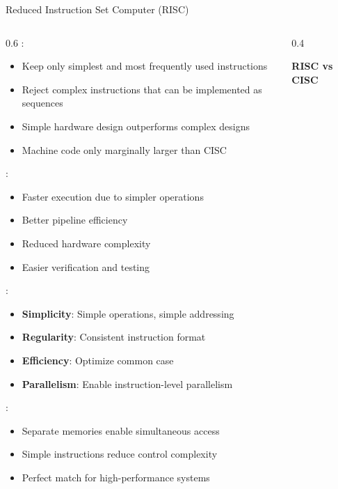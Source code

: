 \begin{frame}{Reduced Instruction Set Computer (RISC)}
\begin{columns}
\begin{column}{0.6\textwidth}
:
\begin{itemize}
\item Keep only simplest and most frequently used instructions
\item Reject complex instructions that can be implemented as sequences
\item Simple hardware design outperforms complex designs
\item Machine code only marginally larger than CISC
\end{itemize}

\vspace{0.3cm}
:
\begin{itemize}
\item Faster execution due to simpler operations
\item Better pipeline efficiency
\item Reduced hardware complexity
\item Easier verification and testing
\end{itemize}

\vspace{0.3cm}
:
\begin{itemize}
\item \textbf{Simplicity}: Simple operations, simple addressing
\item \textbf{Regularity}: Consistent instruction format
\item \textbf{Efficiency}: Optimize common case
\item \textbf{Parallelism}: Enable instruction-level parallelism
\end{itemize}

\vspace{0.3cm}
:
\begin{itemize}
\item Separate memories enable simultaneous access
\item Simple instructions reduce control complexity
\item Perfect match for high-performance systems
\end{itemize}
\end{column}
\begin{column}{0.4\textwidth}
\begin{center}
\textbf{RISC vs CISC}
\vspace{0.3cm}


\end{center}
\end{column}
\end{columns}
\end{frame}
